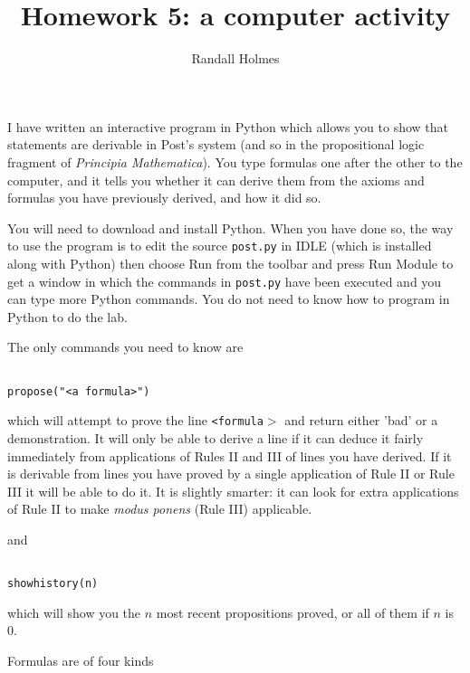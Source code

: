 \documentclass[12pt]{article}
\title{Homework 5:  a computer activity}
\author{Randall Holmes}
\begin{document}
\maketitle

I have written an interactive program in Python which allows you to show that statements are derivable in Post's system (and so in the propositional logic fragment of
{\em Principia Mathematica\/}).  You type formulas one after the other to the computer, and it tells you whether it can derive them from the axioms and formulas you have previously derived, and how it did so.

You will need to download and install Python.  When you have done so, the way to use the program is to edit the source {\tt post.py} in IDLE (which is installed along with Python)
then choose Run from the toolbar and press Run Module to get a window in which the commands in {\tt post.py} have been executed and you can type more Python commands.  You do not need to know how to program in Python to do the lab.

The only commands you need to know are

\begin{verbatim}

propose("<a formula>")

\end{verbatim}

which will attempt to prove the line {\tt <formula$>$}  and return either 'bad' or a demonstration.  It will only be able to derive a line if it can deduce it fairly immediately 
from applications of Rules II and III of lines you have derived.  If it is derivable from lines you have proved by a single application of Rule II or Rule III it will be able to do it.
It is slightly smarter:  it can look for extra applications of Rule II to make {\em modus ponens\/} (Rule III) applicable.

and 

\begin{verbatim}

showhistory(n)

\end{verbatim}

which will show you the $n$ most recent propositions proved, or all of them if $n$ is 0.

Formulas are of four kinds
\end{document}
